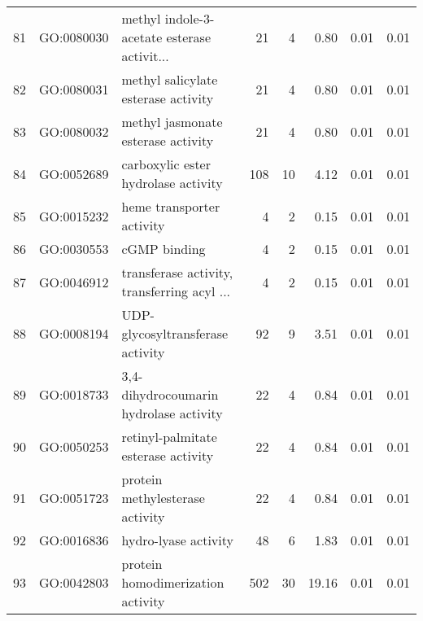 \begin{table}[ht]
\begin{tabular}{rllrrrrr}
  81 & GO:0080030 & methyl indole-3-acetate esterase activit... &  21 &   4 & 0.80 & 0.01 & 0.01 \\ 
  82 & GO:0080031 & methyl salicylate esterase activity &  21 &   4 & 0.80 & 0.01 & 0.01 \\ 
  83 & GO:0080032 & methyl jasmonate esterase activity &  21 &   4 & 0.80 & 0.01 & 0.01 \\ 
  84 & GO:0052689 & carboxylic ester hydrolase activity & 108 &  10 & 4.12 & 0.01 & 0.01 \\ 
  85 & GO:0015232 & heme transporter activity &   4 &   2 & 0.15 & 0.01 & 0.01 \\ 
  86 & GO:0030553 & cGMP binding &   4 &   2 & 0.15 & 0.01 & 0.01 \\ 
  87 & GO:0046912 & transferase activity, transferring acyl ... &   4 &   2 & 0.15 & 0.01 & 0.01 \\ 
  88 & GO:0008194 & UDP-glycosyltransferase activity &  92 &   9 & 3.51 & 0.01 & 0.01 \\ 
  89 & GO:0018733 & 3,4-dihydrocoumarin hydrolase activity &  22 &   4 & 0.84 & 0.01 & 0.01 \\ 
  90 & GO:0050253 & retinyl-palmitate esterase activity &  22 &   4 & 0.84 & 0.01 & 0.01 \\ 
  91 & GO:0051723 & protein methylesterase activity &  22 &   4 & 0.84 & 0.01 & 0.01 \\ 
  92 & GO:0016836 & hydro-lyase activity &  48 &   6 & 1.83 & 0.01 & 0.01 \\ 
  93 & GO:0042803 & protein homodimerization activity & 502 &  30 & 19.16 & 0.01 & 0.01 \\ 
   \hline
\end{tabular}
\end{table}

